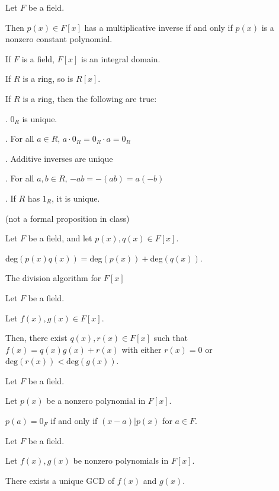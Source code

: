 \documentclass{article}
\begin{document}

    Let $F$ be a field.
    
    Then $p(x)\in F[x]$ has a multiplicative inverse if and only if $p(x)$ is a nonzero constant polynomial.


    If $F$ is a field, $F[x]$ is an integral domain.
    

    If $R$ is a ring, so is $R[x]$.
    

    If $R$ is a ring, then the following are true:
    
    \indent{}. $0_R$ is unique.
    
    \indent{}. For all $a\in R$, $a\cdot 0_R = 0_R \cdot a = 0_R$
    
    \indent{}. Additive inverses are unique
    
    \indent{}. For all $a,b\in R$, $-ab=-(ab)=a(-b)$
    
    \indent{}. If $R$ has $1_R$, it is unique.

\newpage

 (not a formal proposition in class)

    Let $F$ be a field, and let $p(x), q(x) \in F[x]$.

    deg$(p(x)q(x))=$deg$(p(x)) + $deg$(q(x))$.

 The division algorithm for $F[x]$

Let $F$ be a field.

Let $f(x), g(x)\in F[x]$.

Then, there exist $q(x), r(x) \in F[x]$ such that $f(x)=q(x)g(x)+r(x)$ with either $r(x)=0$ or $\text{deg}(r(x)) < \text{deg}(g(x))$.


Let $F$ be a field.

Let $p(x)$ be a nonzero polynomial in $F[x]$.

$p(a)=0_F$ if and only if $(x-a)|p(x)$ for $a\in F$.


Let $F$ be a field.

Let $f(x), g(x)$ be nonzero polynomials in $F[x]$.

There exists a unique GCD of $f(x)$ and $g(x)$.
\end{document}
